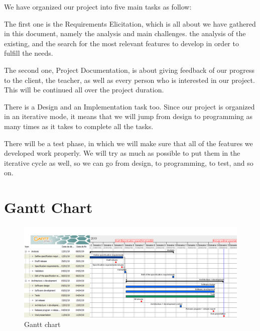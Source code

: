 We have organized our project into five main tasks as follow:

The first one is the Requirements Elicitation, which is all about we have gathered in this document, namely the analysis and main challenges. the analysis of the existing, and the search for the most relevant features to develop in order to fulfill the needs.

The second one, Project Documentation, is about giving feedback of our progress to the client, the teacher, as well as every person who is interested in our project. This will be continued all over the project duration.

There is a Design and an Implementation task too. Since our project is organized in an iterative mode, it means that we will jump from design to programming as many times as it takes to complete all the tasks.

There will be a test phase, in which we will make sure that all of the features we developed work properly. We will try as much as possible to put them in the iterative cycle as well, so we can go from design, to programming, to test, and so on.

\section{Gantt Chart}
\begin{figure}[!ht]
    \includegraphics[scale=0.45]{figures/ganttPyTorchfinal.png}
    \caption{Gantt chart}
\end{figure}
\pagebreak
